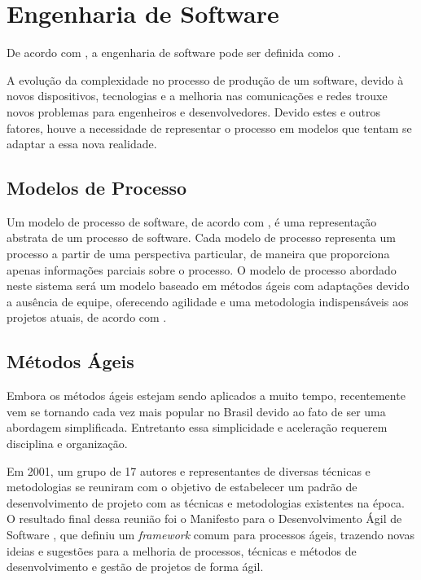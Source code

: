 \section{Engenharia de Software}

De acordo com \cite{pressman2016engenharia}, a engenharia de software pode ser definida como .

A evolução da complexidade no processo de produção de um software, devido à novos dispositivos, tecnologias e a melhoria nas comunicações e redes trouxe novos problemas para engenheiros e desenvolvedores. Devido estes e outros fatores, houve a necessidade de representar o processo em modelos que tentam se adaptar a essa nova realidade.

\subsection{Modelos de Processo}

Um modelo de processo de software, de acordo com \cite{sommerville2011software}, é uma representação abstrata de um processo de software. Cada modelo de processo representa um processo a partir de uma perspectiva particular, de maneira que proporciona apenas
informações parciais sobre o processo. O modelo de processo abordado neste sistema será um modelo baseado em métodos ágeis com adaptações devido a ausência de equipe, oferecendo agilidade e uma metodologia indispensáveis aos projetos atuais, de acordo com \cite{beck2001manifesto}.

\subsection{Métodos Ágeis}

Embora os métodos ágeis estejam sendo aplicados a muito tempo, recentemente vem se tornando cada vez mais popular no Brasil devido ao fato de ser uma abordagem simplificada. Entretanto essa simplicidade e aceleração requerem disciplina e organização.

Em 2001, um grupo de 17 autores e representantes de diversas técnicas e metodologias se reuniram com o objetivo de estabelecer um padrão de desenvolvimento de projeto com as técnicas e metodologias existentes na época. O resultado final dessa reunião foi o Manifesto para o Desenvolvimento Ágil de Software \cite{beck2001manifesto}, que definiu um \textit{framework} comum para processos ágeis, trazendo novas ideias e sugestões para a melhoria de processos, técnicas e métodos de desenvolvimento e gestão de projetos de forma ágil.

